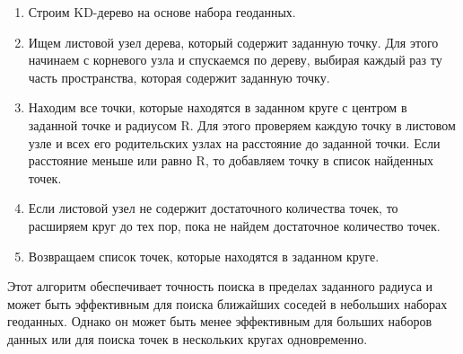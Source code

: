 \begin{enumerate}
    \item Строим KD-дерево на основе набора геоданных.
    \item Ищем листовой узел дерева, который содержит заданную точку. Для этого начинаем с корневого узла и спускаемся по дереву, выбирая каждый раз ту часть пространства, которая содержит заданную точку.
    \item Находим все точки, которые находятся в заданном круге с центром в заданной точке и радиусом R. Для этого проверяем каждую точку в листовом узле и всех его родительских узлах на расстояние до заданной точки. Если расстояние меньше или равно R, то добавляем точку в список найденных точек.
    \item Если листовой узел не содержит достаточного количества точек, то расширяем круг до тех пор, пока не найдем достаточное количество точек.
    \item Возвращаем список точек, которые находятся в заданном круге.
\end{enumerate}

Этот алгоритм обеспечивает точность поиска в пределах заданного радиуса и может быть эффективным для поиска ближайших соседей в небольших наборах геоданных. Однако он может быть менее эффективным для больших наборов данных или для поиска точек в нескольких кругах одновременно.

